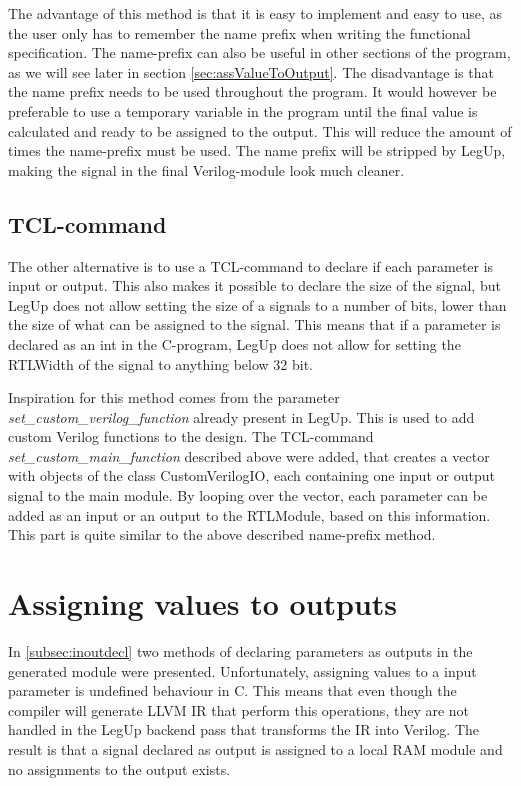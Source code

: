 The advantage of this method is that it is easy to implement and easy to use, as the user only has to remember the name prefix when writing the functional specification. The name-prefix can also be useful in other sections of the program, as we will see later in section \ref{sec:assValueToOutput}. The disadvantage is that the name prefix needs to be used throughout the program. It would however be preferable to use a temporary variable in the program until the final value is calculated and ready to be assigned to the output. This will reduce the amount of times the name-prefix must be used. The name prefix will be stripped by LegUp, making the signal in the final Verilog-module look much cleaner.
\subsection{\label{subsubsec:inoutparameter}TCL-command}
The other alternative is to use a TCL-command to declare if each parameter is input or output. This also makes it possible to declare the size of the signal, but LegUp does not allow setting the size of a signals to a number of bits, lower than the size of what can be assigned to the signal. This means that if a parameter is declared as an int in the C-program, LegUp does not allow for setting the RTLWidth of the signal to anything below 32 bit.

Inspiration for this method comes from the parameter \textit{set\_custom\_verilog\_function} already present in LegUp. This is used to add custom Verilog functions to the design. The TCL-command \textit{set\_custom\_main\_function} described above were added, that creates a vector with objects of the class CustomVerilogIO, each containing one input or output signal to the main module. By looping over the vector, each parameter can be added as an input or an output to the RTLModule, based on this information. This part is quite similar to the above described name-prefix method.

\section{\label{sec:assValueToOutput}Assigning values to outputs}
In \cref{subsec:inoutdecl} two methods of declaring parameters as outputs in the generated module were presented. Unfortunately, assigning values to a input parameter is undefined behaviour in C. This means that even though the compiler will generate LLVM IR that perform this operations, they are not handled in the LegUp backend pass that transforms the IR into Verilog. The result is that a signal declared as output is assigned to a local RAM module and no assignments to the output exists.

